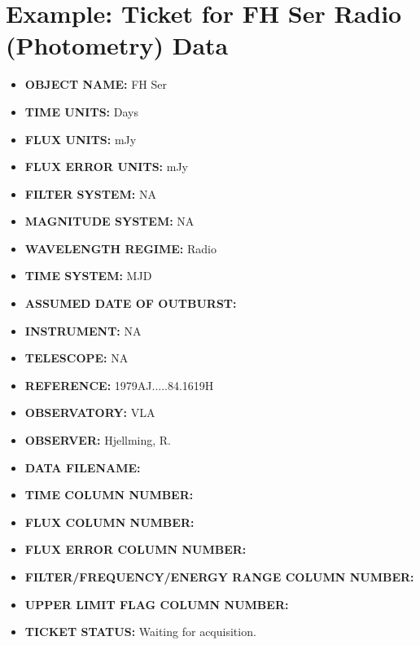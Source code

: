 \documentclass{article}
\begin{document}
\newpage
\appendix
\section{Example: Ticket for FH Ser Radio (Photometry) Data}

\begin{itemize}
\item \textbf{OBJECT NAME:} FH Ser
\item \textbf{TIME UNITS:} Days
\item \textbf{FLUX UNITS:} mJy
\item \textbf{FLUX ERROR UNITS:} mJy
\item \textbf{FILTER SYSTEM:} NA
\item \textbf{MAGNITUDE SYSTEM:} NA
\item \textbf{WAVELENGTH REGIME:} Radio
\item \textbf{TIME SYSTEM:} MJD
\item \textbf{ASSUMED DATE OF OUTBURST:}
\item \textbf{INSTRUMENT:} NA
\item \textbf{TELESCOPE:} NA
\item \textbf{REFERENCE:} 1979AJ.....84.1619H
\item \textbf{OBSERVATORY:} VLA
\item \textbf{OBSERVER:} Hjellming, R.
\item \textbf{DATA FILENAME:}
\item \textbf{TIME COLUMN NUMBER:}
\item \textbf{FLUX COLUMN NUMBER:} 
\item \textbf{FLUX ERROR COLUMN NUMBER:} 
\item \textbf{FILTER/FREQUENCY/ENERGY RANGE COLUMN NUMBER:} 
\item \textbf{UPPER LIMIT FLAG COLUMN NUMBER:} 
\item \textbf{TICKET STATUS:} Waiting for acquisition.
\end{itemize}

\end{document}

